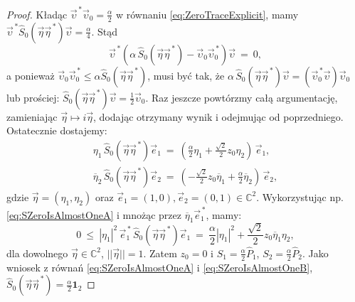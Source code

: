 {\begin{proof}
Kładąc $\vec{\upsilon}^{\,*} \vec{\upsilon}_{0} = \frac{\alpha}{2}$
w równaniu \eqref{eq:ZeroTraceExplicit}, mamy
$
\vec{\upsilon}^{\,*} \hat{S}_{0}(\vec{\eta} \vec{\eta}^{\,*}) \vec{\upsilon} =
\frac{\alpha}{4}
$.
Stąd
\begin{equation}
 \vec{\upsilon}^{\,*} \left(
    \alpha \, \hat{S}_{0}(\vec{\eta} \vec{\eta}^{\,*}) -\vec{\upsilon}_{0} \vec{\upsilon}_{0}^{\,*}
  \right) \vec{\upsilon} \: = \: 0,
\end{equation}
a ponieważ
$\vec{\upsilon}_{0} \vec{\upsilon}_{0}^{\,*} \leq  \alpha \hat{S}_{0}(\vec{\eta} \vec{\eta}^{\,*})$,
musi być tak, że
$ \alpha \, \hat{S}_{0}(\vec{\eta} \vec{\eta}^{\,*}) \vec{\upsilon} =
\left( \vec{\upsilon}_{0}^{\,*} \vec{\upsilon} \right)  \vec{\upsilon}_{0}$
lub prościej:
$ \hat{S}_{0}(\vec{\eta} \vec{\eta}^{\,*}) \vec{\upsilon} = \frac{1}{2} \vec{\upsilon}_{0}$.
Raz jeszcze powtórzmy całą argumentację, zamieniając
$\vec{\eta} \mapsto i \vec{\eta}$,
dodając otrzymany wynik i odejmując od poprzedniego.
Ostatecznie dostajemy:
\begin{subequations}
    \begin{align}
\label{eq:SZeroIsAlmostOneA}
\eta_{1} \, \hat{S}_{0}(\vec{\eta} \vec{\eta}^{\,*}) \vec{e}_{1} \: = \:
   \left( \frac{\alpha}{2} \eta_{1} + \frac{\sqrt{2}}{2} z_{0} \eta_{2} \right) \, \vec{e}_{1}, \\
\label{eq:SZeroIsAlmostOneB}
\overline{\eta}_{2} \, \hat{S}_{0}(\vec{\eta} \vec{\eta}^{\,*}) \vec{e}_{2} \: = \:
   \left(- \frac{\sqrt{2}}{2} z_{0} \overline{\eta}_{1} + \frac{\alpha}{2} \overline{\eta}_{2} \right)
       \, \vec{e}_{2},
    \end{align}
\end{subequations}
gdzie $\vec{\eta} = (\eta_{1}, \eta_{2})$ oraz
$\vec{e}_{1} = (1,0), \vec{e}_{2} = (0,1) \in \mathbb{C}^{2}$.
Wykorzystując np. \eqref{eq:SZeroIsAlmostOneA}
i mnożąc przez  $\overline{\eta}_{1} \vec{e}_{1}^{\,*}$,
mamy:
\begin{equation}
0 \: \leq \:
 |\eta_{1}|^{2} \, \vec{e}_{1}^{\,*} \, \hat{S}_{0}(\vec{\eta} \vec{\eta}^{\,*}) \vec{e}_{1}
 \: = \:
\frac{\alpha}{2} |\eta_{1}|^{2} + \frac{\sqrt{2}}{2} z_{0} \overline{\eta}_{1} \eta_{2},
\end{equation}
dla dowolnego $\vec{\eta} \in \mathbb{C}^{2}$, $||\vec{\eta}|| =1$.
Zatem $z_{0} = 0$ i
$S_{1} = \frac{\alpha}{2} \hat{P}_{1}$,
$S_{2} = \frac{\alpha}{2} \hat{P}_{2}$.
Jako wniosek z równań
\eqref{eq:SZeroIsAlmostOneA} i \eqref{eq:SZeroIsAlmostOneB},
$\hat{S}_{0} (\vec{\eta} \vec{\eta}^{\,*}) = \frac{\alpha}{2} \mathbf{1}_{2}$

\end{proof}}
